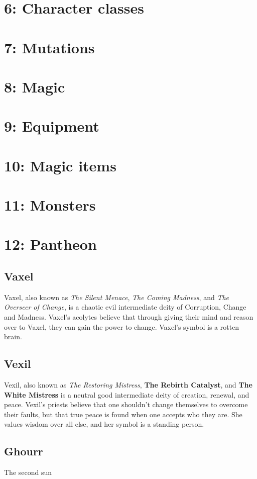 \documentclass[a4paper]{article}
\begin{document}
\section{6: Character classes}

\section{7: Mutations}

\section{8: Magic}

\section{9: Equipment}

\section{10: Magic items}

\section{11: Monsters}

\section{12: Pantheon}

\subsection{Vaxel}
Vaxel, also known as \textit{The Silent Menace}, \textit{The Coming Madness}, and \textit{The Overseer of Change}, is a chaotic evil intermediate deity of Corruption, Change and Madness. Vaxel's acolytes believe that through giving their mind and reason over to Vaxel, they can gain the power to change. Vaxel's symbol is a rotten brain.\\


\subsection{Vexil}
Vexil, also known as \textit{The Restoring Mistress}, \textbf{The Rebirth Catalyst}, and \textbf{The White Mistress} is a neutral good intermediate deity of creation, renewal, and peace. Vexil's priests believe that one shouldn't change themselves to overcome their faults, but that true peace is found when one accepts who they are. She values wisdom over all else, and her symbol is a standing person.

\subsection{Ghourr}
The second sun
\end{document}
